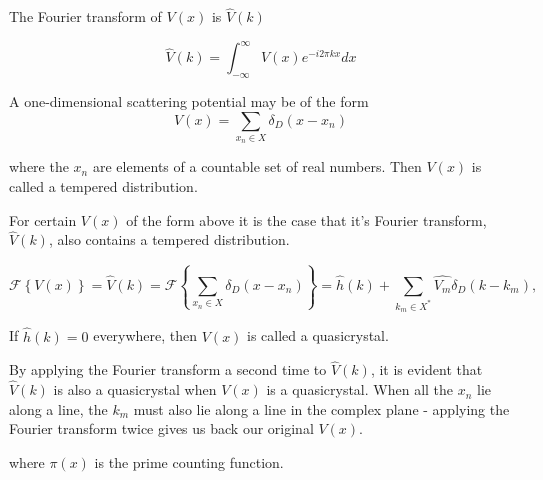 \documentclass[11pt, oneside]{article}   	%
\begin{document}
The Fourier transform of $V(x)$ is $\hat{V}(k)$ 

\begin{equation}
\hat{V}(k) = \int_{-\infty}^{\infty}V(x)e^{-i2\pi kx}dx
\end{equation}

A one-dimensional scattering potential may be of the form 
\begin{equation}
V(x) = \sum_{x_n \in X}\delta_D(x - x_n)
\end{equation} 
 
where the $x_n$ are elements of a countable set of real numbers. 
Then $V(x)$ is called a tempered distribution.


 For certain $V(x)$ of the form above it is the case that it's Fourier transform, $\hat{V}(k)$, also contains a tempered distribution. 
  
\begin{equation}
 \label{eq: RiemannFourier}
 \mathcal{F}\left \{V(x)\right \} = \hat{V}(k) = \mathcal{F}\left \{ \sum_{x_n \in X}\delta_D(x - x_n) \right \} = \hat{h}(k) +  \sum_{k_m \in X^{*}} \hat{V_{m}} \delta_D(k - k_{m}),
\end{equation}

If $\hat{h}(k) = 0$ everywhere, then $V(x)$ is called a quasicrystal.

By applying the Fourier transform a second time to $\hat{V}(k)$, it is evident that $\hat{V}(k)$ is also a quasicrystal when $V(x)$ is a quasicrystal. When all the $x_n$ lie along a line, the $k_m$ must also lie along a line in the complex plane - applying the Fourier transform twice gives us back our original $V(x)$.


where $\pi(x)$ is the prime counting function.






\end{document}
